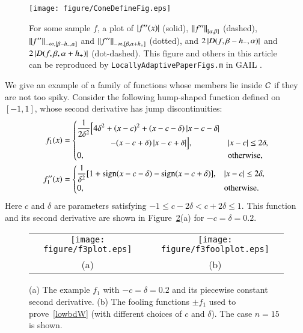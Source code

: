 \documentclass[review]{elsarticle}
\theoremstyle{definition}
\newenvironment{FJHchange}{}{} %
\begin{document}
\begin{figure}
	\centering
	\texttt{[image: figure/ConeDefineFig.eps]}
	\caption{For some sample $f$, a plot of $\abs{f''(x)}$ (solid),
	$\norm[{[\alpha,\beta]}]{f''}$ (dashed),
   $\norm[-\infty,{[\beta - h_-,\alpha]}]{f''}$ and $\norm[-\infty,{[\beta,
    \alpha+h_+]}]{f''}$ (dotted), and
    $2\abs{D(f,\beta - h_-,\alpha)}$ and $2\abs{D(f,\beta,\alpha+h_+)}$ (dot-dashed).
    This figure and others in this article can be reproduced by
    \texttt{LocallyAdaptivePaperFigs.m} in GAIL \cite{ChoEtal15a}.
    \label{fig:ConeDef}}
\end{figure}

We give an example of a family of functions whose members lie
inside $\cc$ if they are not too spiky.
Consider the following hump-shaped function defined on $[-1,1]$, whose
second derivative has jump discontinuities:
\begin{align} \label{f3def}
f_1(x) & = \begin{cases} \displaystyle
   \frac{1}{2\delta^2} \Bigl [4 \delta^2 + (x-c)^2 + (x-c-\delta)\abs{x-c-\delta}
\\ \qquad \qquad
    - (x-c+\delta)\abs{x-c+\delta} \Bigr ], & \abs{x-c} \le 2\delta,
\\ 0, & \text{otherwise},
\end{cases}
\\ \nonumber
f''_1(x) & =
\begin{cases} \displaystyle
    \frac{1}{\delta^2} [1 + \sign(x-c-\delta) - \sign(x-c+\delta)\begin{FJHchange}
    ]
    \end{FJHchange}, & \abs{x-c} \le 2\delta,
\\ 0, & \text{otherwise}.
\end{cases}
\end{align}
Here $c$ and $\delta$ are parameters satisfying $-1 \le c-2 \delta < c+ 2\delta
\le 1$. This function and its second derivative are shown in Figure~\ref{f3fig}(a)
for $-c=\delta = 0.2$.


\begin{figure}[tb]
\centering
\begin{tabular}{cc}
\texttt{[image: figure/f3plot.eps]}
& \texttt{[image: figure/f3foolplot.eps]}
\\[1ex] (a) & (b)
\end{tabular}
\caption{(a) The example $f_1$ with $-c=\delta = 0.2$ and its piecewise constant
second derivative.
(b) The fooling functions $\pm f_1$ used to prove~\eqref{lowbdW} (with different choices
of $c$ and $\delta$). The case
$n=15$ is shown. \label{f3fig}}
\end{figure}
\end{document}

